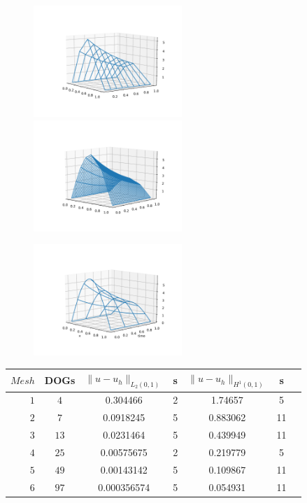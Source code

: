 \documentclass{uonmathreport}
\theoremstyle{definition}
\theoremstyle{problem}
\theoremstyle{theorem}
\begin{document}
\begin{figure}[h]
   \includegraphics[width=0.5\textwidth]{firstPDE3d.pdf}
   \includegraphics[width=0.5\textwidth]{firstPDE3dfine.pdf}
   
 \label{fig:firstPDE3d}
\end{figure}


\begin{figure}[h]
   \includegraphics[width=0.5\textwidth]{Heat1angle.pdf}
   
 \label{fig:Heat1}
\end{figure}



\begin{center}
  \begin{tabular}{r|cccccc}  \label{table:Parabolic1}
    $Mesh$   & DOGs & $\|u-u_h\|_{L_2(0,1)}$ & s & $\|u-u_h\|_{H^1(0,1)}$ & s  \\ \hline
    $1$ & $4$ & 0.304466 & 2 & 1.74657 & 5  \\
    $2$ & $7$ & 0.0918245 & 5 & 0.883062 & 11  \\
    $3$ & $13$ & 0.0231464 & 5 & 0.439949 & 11  \\
	$4$ & $25$ & 0.00575675 & 2 & 0.219779 & 5 \\
    $5$ & $49$ & 0.00143142 & 5 & 0.109867 & 11  \\
    $6$ & $97$ & 0.000356574 & 5 & 0.054931 & 11 \\
  \end{tabular}
\end{center}
\end{document}
